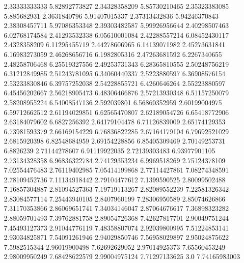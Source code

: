   2.33333333333    5.82892773827
  2.34328358209    5.85730210465
  2.35323383085      5.885682931
   2.3631840796    5.91407015337
  2.37313432836    5.94246370843
  2.38308457711    5.97086353348
  2.39303482587    5.99926956644
  2.40298507463    6.02768174584
  2.41293532338    6.05610001084
  2.42288557214    6.08452430117
   2.4328358209    6.11295455719
  2.44278606965    6.14139071982
  2.45273631841    6.16983273059
  2.46268656716     6.1982805316
  2.47263681592     6.2267340655
  2.48258706468    6.25519327556
  2.49253731343    6.28365810555
  2.50248756219    6.31212849985
  2.51243781095    6.34060440337
   2.5223880597    6.36908576154
  2.53233830846    6.39757252038
  2.54228855721     6.4260646264
  2.55223880597    6.45456202667
  2.56218905473    6.48306466876
  2.57213930348    6.51157250079
  2.58208955224    6.54008547136
    2.592039801    6.56860352959
  2.60199004975    6.59712662512
  2.61194029851    6.62565470807
  2.62189054726    6.65418772906
  2.63184079602     6.6827256392
  2.64179104478    6.71126839009
  2.65174129353    6.73981593379
  2.66169154229    6.76836822285
  2.67164179104    6.79692521029
   2.6815920398    6.82548684959
  2.69154228856    6.85405309469
  2.70149253731        6.8826239
  2.71144278607    6.91119922035
  2.72139303483    6.93977901105
  2.73134328358    6.96836322784
  2.74129353234     6.9969518269
  2.75124378109    7.02554476483
  2.76119402985    7.05414199868
  2.77114427861    7.08274348591
  2.78109452736    7.11134918442
  2.79104477612     7.1399590525
  2.80099502488    7.16857304887
  2.81094527363    7.19719113267
  2.82089552239    7.22581326342
  2.83084577114    7.25443940105
   2.8407960199    7.28306950589
  2.85074626866    7.31170353866
  2.86069651741    7.34034146047
  2.87064676617    7.36898323282
  2.88059701493    7.39762881758
  2.89054726368    7.42627817701
  2.90049751244    7.45493127373
  2.91044776119    7.48358807074
  2.92039800995    7.51224853141
  2.93034825871    7.54091261946
  2.94029850746    7.56958029897
  2.95024875622     7.5982515344
  2.96019900498    7.62692629052
  2.97014925373    7.65560453249
  2.98009950249    7.68428622579
  2.99004975124    7.71297133625
            3.0    7.74165983003
